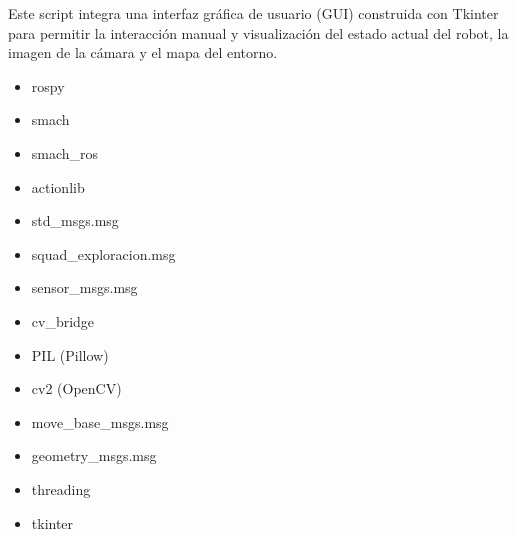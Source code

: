 \documentclass[a4paper,10pt,spanish]{sphinxmanual}
\begin{document}
\sphinxAtStartPar
Este script integra una interfaz gráfica de usuario (GUI) construida con Tkinter para permitir la interacción
manual y visualización del estado actual del robot, la imagen de la cámara y el mapa del entorno.
\begin{description}
\begin{itemize}
\item {} 
\sphinxAtStartPar
rospy

\item {} 
\sphinxAtStartPar
smach

\item {} 
\sphinxAtStartPar
smach\_ros

\item {} 
\sphinxAtStartPar
actionlib

\item {} 
\sphinxAtStartPar
std\_msgs.msg

\item {} 
\sphinxAtStartPar
squad\_exploracion.msg

\item {} 
\sphinxAtStartPar
sensor\_msgs.msg

\item {} 
\sphinxAtStartPar
cv\_bridge

\item {} 
\sphinxAtStartPar
PIL (Pillow)

\item {} 
\sphinxAtStartPar
cv2 (OpenCV)

\item {} 
\sphinxAtStartPar
move\_base\_msgs.msg

\item {} 
\sphinxAtStartPar
geometry\_msgs.msg

\item {} 
\sphinxAtStartPar
threading

\item {} 
\sphinxAtStartPar
tkinter

\end{itemize}

\end{description}
\end{document}

